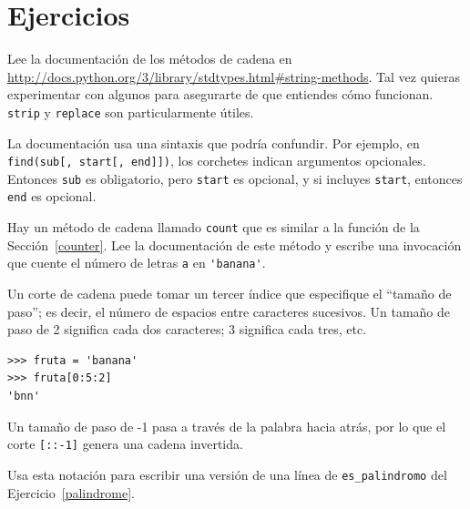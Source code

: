 \documentclass[10pt]{book}
\begin{document}
\section{Ejercicios}

\begin{exercise}

Lee la documentación de los métodos de cadena en
\url{http://docs.python.org/3/library/stdtypes.html#string-methods}.
Tal vez quieras experimentar con algunos para asegurarte de que
entiendes cómo funcionan.  {\tt strip} y {\tt replace} son
particularmente útiles.

La documentación usa una sintaxis que podría confundir.
Por ejemplo, en \verb"find(sub[, start[, end]])", los corchetes
indican argumentos opcionales.  Entonces {\tt sub} es obligatorio, pero
{\tt start} es opcional, y si incluyes {\tt start},
entonces {\tt end} es opcional.

\end{exercise}


\begin{exercise}

Hay un método de cadena llamado {\tt count} que es similar
a la función de la Sección~\ref{counter}.  Lee la documentación
de este método
y escribe una invocación que cuente el número de letras {\tt a}
en \verb"'banana'".
\end{exercise}


\begin{exercise}

Un corte de cadena puede tomar un tercer índice que especifique el ``tamaño
de paso''; es decir, el número de espacios entre caracteres sucesivos.
Un tamaño de paso de 2 significa cada dos caracteres; 3 significa cada tres,
etc.

\begin{verbatim}
>>> fruta = 'banana'
>>> fruta[0:5:2]
'bnn'
\end{verbatim}

Un tamaño de paso de -1 pasa a través de la palabra hacia atrás, por lo que
el corte \verb"[::-1]" genera una cadena invertida.

Usa esta notación para escribir una versión de una línea de \verb"es_palindromo"
del Ejercicio~\ref{palindrome}.
\end{exercise}
\end{document}
